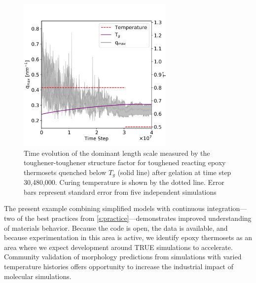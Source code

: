 \begin{figure}
    \centering
    \includegraphics[width=3in]{figures/pub4/epoxy_post_gel.png}
    \caption{Time evolution of the dominant length scale measured by the toughener-toughener structure factor for toughened reacting epoxy thermosets quenched below $T_g$ (solid line) after gelation at time step 30,480,000. Curing temperature is shown by the dotted line. Error bars represent standard error from five independent simulations}
    \label{epoxy_post_gel} %
\end{figure}

The present example combining simplified models with continuous integration---two of the best practices from \autoref{s:practice}---demonstrates improved understanding of materials behavior.
Because the code is open, the data is available, and because experimentation in this area is active, we identify epoxy thermosets as an area where we expect development around TRUE simulations to accelerate.
Community validation of morphology predictions from simulations with varied temperature histories offers opportunity to increase the industrial impact of molecular simulations.


